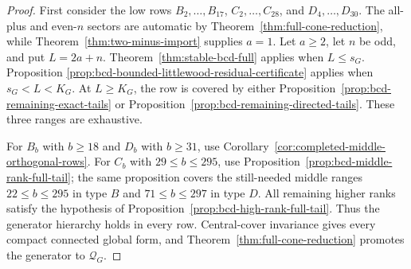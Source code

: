 \documentclass[11pt,reqno]{amsart}
\theoremstyle{plain}
\theoremstyle{definition}
\newcommand{\Qcone}{\mathcal Q}
\begin{document}
\begin{proof}
First consider the low rows $B_2,\ldots,B_{17}$,
$C_2,\ldots,C_{28}$, and $D_4,\ldots,D_{30}$.  The all-plus and even-$n$
sectors are automatic by Theorem~\ref{thm:full-cone-reduction}, while
Theorem~\ref{thm:two-minus-import} supplies $a=1$.  Let $a\geq2$, let $n$
be odd, and put $L=2a+n$.  Theorem~\ref{thm:stable-bcd-full} applies when
$L\leq s_G$.  Proposition
\ref{prop:bcd-bounded-littlewood-residual-certificate} applies when
$s_G<L<K_G$.  At $L\geq K_G$, the row is covered by either
Proposition~\ref{prop:bcd-remaining-exact-tails} or
Proposition~\ref{prop:bcd-remaining-directed-tails}.  These three ranges are
exhaustive.

For $B_b$ with $b\geq18$ and $D_b$ with $b\geq31$, use
Corollary~\ref{cor:completed-middle-orthogonal-rows}.  For $C_b$ with
$29\leq b\leq295$, use
Proposition~\ref{prop:bcd-middle-rank-full-tail}; the same proposition covers
the still-needed middle ranges $22\leq b\leq295$ in type $B$ and
$71\leq b\leq297$ in type $D$.  All remaining higher ranks satisfy the
hypothesis of Proposition~\ref{prop:bcd-high-rank-full-tail}.  Thus the
generator hierarchy holds in every row.  Central-cover invariance gives every
compact connected global form, and
Theorem~\ref{thm:full-cone-reduction} promotes the generator to $\Qcone_G$.
\end{proof}
\end{document}
